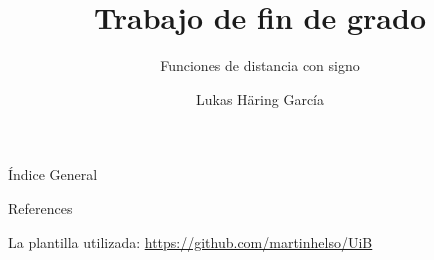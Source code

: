 \documentclass[spanish]{beamer}
\author{Lukas Häring García}
\title{Trabajo de fin de grado}
\subtitle{Funciones de distancia con signo}
\begin{document}
    \begin{frame}{Índice General}
        \tableofcontents
    \end{frame}
    
    
    
    
    
    
    
    
    
    
    
    
    
    
    
    
    

    \begin{frame}[allowframebreaks]{References}
        
        
    	
    	\printbibliography
        
        La plantilla utilizada:
        \url{https://github.com/martinhelso/UiB}
        
    \end{frame}
\end{document}
